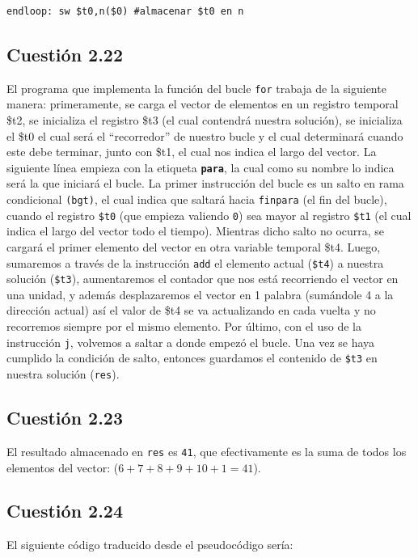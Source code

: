 \documentclass[11pt]{article}
\begin{document}
\begin{large}
\begin{flushleft}
\begin{listing}[h]
\begin{verbatim}
endloop: sw $t0,n($0) #almacenar $t0 en n

\end{verbatim}
\end{listing}

\subsection*{Cuestión 2.22}
El programa que implementa la función del bucle \texttt{for} trabaja de la siguiente manera: primeramente, se carga el vector de elementos en un registro temporal \$t2, se inicializa el registro \$t3 (el cual contendrá nuestra solución), se inicializa el \$t0 el cual será el ``recorredor'' de nuestro bucle y el cual determinará cuando este debe terminar, junto con \$t1, el cual nos indica el largo del vector. La siguiente línea empieza con la etiqueta \textbf{\texttt{para}}, la cual como su nombre lo indica será la que iniciará el bucle. La primer instrucción del bucle es un salto en rama condicional \texttt{(bgt)}, el cual indica que saltará hacia \texttt{finpara} (el fin del bucle), cuando el registro \texttt{\$t0} (que empieza valiendo \texttt{0}) sea mayor al registro \texttt{\$t1} (el cual indica el largo del vector todo el tiempo). Mientras dicho salto no ocurra, se cargará el primer elemento del vector en otra variable temporal \$t4. Luego, sumaremos a través de la instrucción \texttt{add} el elemento actual (\texttt{\$t4}) a nuestra solución (\texttt{\$t3}), aumentaremos el contador que nos está recorriendo el vector en una unidad, y además desplazaremos el vector en 1 palabra (sumándole 4 a la dirección actual) así el valor de \$t4 se va actualizando en cada vuelta y no recorremos siempre por el mismo elemento. Por último, con el uso de la instrucción \texttt{j}, volvemos a saltar a donde empezó el bucle. Una vez se haya cumplido la condición de salto, entonces guardamos el contenido de \texttt{\$t3} en nuestra solución (\texttt{res}).



\subsection*{Cuestión 2.23}
El resultado almacenado en \texttt{res} es \texttt{41}, que efectivamente es la suma de todos los elementos del vector: (\texttt{$6+7+8+9+10+1 = 41$}).


\subsection*{Cuestión 2.24}
El siguiente código traducido desde el pseudocódigo sería:
\begin{listing}[h]
\begin{verbatim}


\end{verbatim}
\end{listing}
\end{flushleft}
\end{large}
\end{document}
